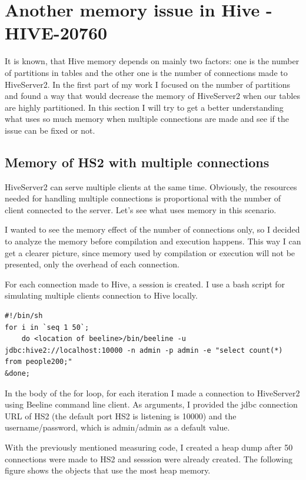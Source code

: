 \chapter{Another memory issue in Hive - HIVE-20760}
It is known, that Hive memory depends on mainly two factors: one is the number of partitions in tables and the other one is the number of connections made to HiveServer2. In the first part of my work I focused on the number of partitions and found a way that would decrease the memory of HiveServer2 when our tables are highly partitioned. In this section I will try to get a better understanding what uses so much memory when multiple connections are made and see if the issue can be fixed or not. 

\section{Memory of HS2 with multiple connections}
HiveServer2 can serve multiple clients at the same time. Obviously, the resources needed for handling multiple connections is proportional with the number of client connected to the server. Let's see what uses memory in this scenario.

I wanted to see the memory effect of the number of connections only, so I decided to analyze the memory before compilation and execution happens. This way I can get a clearer picture, since memory used by compilation or execution will not be presented, only the overhead of each connection. 

For each connection made to Hive, a session is created. I use a bash script for simulating multiple clients connection to Hive locally. 

\begin{lstlisting}
#!/bin/sh
for i in `seq 1 50`; 
	do <location of beeline>/bin/beeline -u jdbc:hive2://localhost:10000 -n admin -p admin -e "select count(*) from people200;" 
&done;	
\end{lstlisting}

In the body of the for loop, for each iteration I made a connection to HiveServer2 using Beeline command line client. As arguments, I provided the jdbc connection URL of HS2 (the default port HS2 is listening is 10000) and the username/password, which is admin/admin as a default value.

With the previously mentioned measuring code, I created a heap dump after 50 connections were made to HS2 and sesssion were already created. The following figure shows the objects that use the most heap memory.

